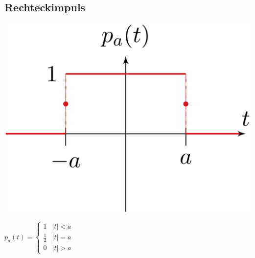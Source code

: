 	\subsection{Rechteckimpuls}
		\begin{minipage}{0.2\textwidth}
			\includegraphics[width=\textwidth]{./bilder/funktionen/rechteckF.png}
		\end{minipage}
		\qquad
		\begin{minipage}{0.45\textwidth}
			$p_{a}(t)=\begin{cases}
							1 & |t|<a \\ 
							\frac{1}{2} & |t|=a \\ 
							0 & |t|>a
						\end{cases}$
		\end{minipage}
		\qquad
		\begin{minipage}{0.25\textwidth}						
		\end{minipage}
	
